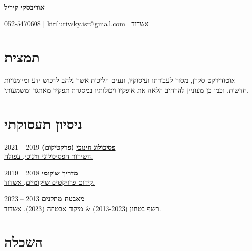 \documentclass[
	12pt,a4paper %
]{article}
\begin{document}
\setRTL
\begin{hebrew}

\begin{center}
	{\Huge{\textbf{אוריבסקי קיריל}}}
	
	
\vspace{2pt}
\colorbox{shade}{ %
	\href{tel:972525470608}{052-5470608} \raisebox{-1pt}{\faPhone} |  \href{mailto:kirilurivsky.isr@gmail.com}{kirilurivsky.isr@gmail.com} \raisebox{0pt}{\small\faEnvelope} | \href{https://goo.gl/maps/MSacjpSy7vZSKykP7}{אשדוד} \raisebox{0pt}{\faHome}
}
\end{center}
	\section{תמצית}
	אוטודידקט סקרן, מסור לעבודתו ועיסוקיו, ונעים הליכות אשר נלהב לרכוש ידע ומיומנויות חדשות, וכמו כן מעוניין להרחיב הלאה את אופקיו ויכולותיו במסגרת תפקיד מאתגר ומשמעותי.
	\section{ניסיון תעסוקתי}

\href{https://loona-il.000webhostapp.com/resume-references/conf.png}	{\textbf{\large פסיכולוג חינוכי}} \textbf{(פרקטיקום)} \hfill 2019 -- 2021 \\
\href{https://loona-il.000webhostapp.com/resume-references/conf.png}	{  השירות הפסיכולוגי חינוכי, עפולה.  }

	\noindent\dotfill %

	\noindent\textbf{\large מדריך שיקומי} \hfill 2018 -- 2019 \\
	\href{http://www.kidumpro.co.il/}{  קידום פרויקטים שיקומיים, אשדוד.}

	\noindent\dotfill %

	\noindent\href{https://loona-il.000webhostapp.com/resume-references/recommendation-letter-security-guard.jpg}{\large \textbf{מאבטח מתקנים}} \hfill 2013 -- 2023 \\
	\href{https://loona-il.000webhostapp.com/resume-references/rec-sec.jpg}{ רשף בטחון (2013-2023) \& מיקוד אבטחה (2023), אשדוד.}

	\section{השכלה}


\end{hebrew}
\end{document}
